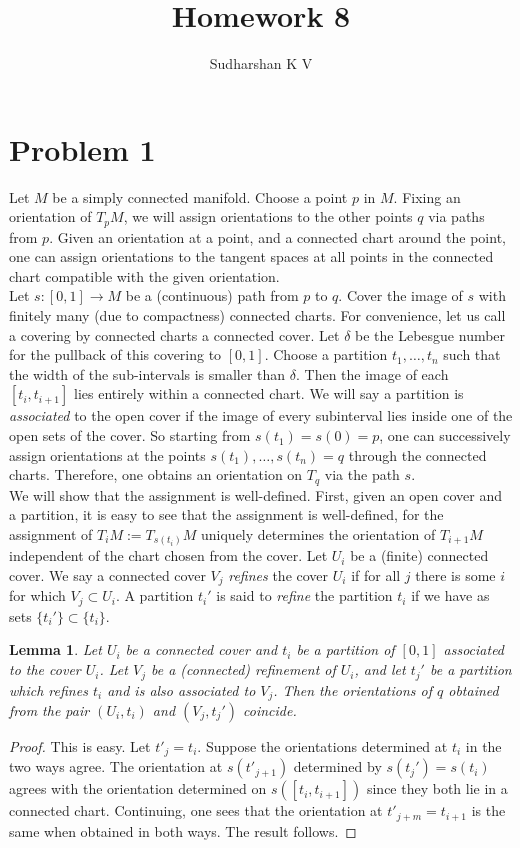 \documentclass{amsart}
\title{Homework 8}
\author{Sudharshan K V}
\numberwithin{equation}{section}
\theoremstyle{plain}
\newtheorem{lemma}[theorem]{Lemma}
\theoremstyle{definition}
\theoremstyle{remark}
\renewcommand{\_}[2]{\underbrace{#1}_{#2}}
\renewcommand{\^}[2]{\overbrace{#1}_{#2}}
\begin{document}
\maketitle

\section*{Problem 1}
Let $M$ be a simply connected manifold. Choose a point $p$ in $M$. Fixing an orientation of $T_pM$, we will assign orientations to the other points $q$ via paths from $p$. Given an orientation at a point, and a connected chart around the point, one can assign orientations to the tangent spaces at all points in the connected chart compatible with the given orientation. \\

Let $s:[0,1] \to M$ be a (continuous) path from $p$ to $q$. Cover the image of $s$ with finitely many (due to compactness) connected charts. For convenience, let us call a covering by connected charts a connected cover. Let $\delta$ be the Lebesgue number for the pullback of this covering to $[0,1]$. Choose a partition $t_1, \dots, t_n$ such that the width of the sub-intervals is smaller than $\delta$. Then the image of each $[t_i, t_{i+1}]$ lies entirely within a connected chart. We will say a partition is \emph{associated} to the open cover if the image of every subinterval lies inside one of the open sets of the cover. So starting from $s(t_1) = s(0) = p$, one can successively assign orientations at the points $s(t_1), \dots, s(t_n) = q$ through the connected charts. Therefore, one obtains an orientation on $T_q$ via the path $s$. \\

We will show that the assignment is well-defined. First, given an open cover and a partition, it is easy to see that the assignment is well-defined, for the assignment of $T_iM := T_{s(t_i)}M$ uniquely determines the orientation of $T_{i+1}M$ independent of the chart chosen from the cover. Let $U_i$ be a (finite) connected cover. We say a connected cover $V_j$ \emph{refines} the cover $U_i$ if for all $j$ there is some $i$ for which $V_j \subset U_i$. A partition $t_i'$ is said to \emph{refine} the partition $t_i$ if we have as sets $\{ t_i'\} \subset \{ t_i\}$. 
\setcounter{section}{1}
  \begin{lemma}
    Let $U_i$ be a connected cover and $t_i$ be a partition of $[0,1]$ associated to the cover $U_i$. Let $V_j$ be a (connected) refinement of $U_i$, and let $t_j'$ be a partition which refines $t_i$ and is also associated to $V_j$. Then the orientations of $q$ obtained from the pair $(U_i, t_i)$ and $(V_j, t_j')$ coincide.
  \end{lemma}
  \begin{proof}
    This is easy. Let $t'_j = t_i$. Suppose the orientations determined at $t_i$ in the two ways agree. The orientation at $s(t'_{j+1})$ determined by $s(t_j') = s(t_i)$ agrees with the orientation determined on $s([t_i,t_{i+1}])$ since they both lie in a connected chart. Continuing, one sees that the orientation at $t'_{j+m} = t_{i+1}$ is the same when obtained in both ways. The result follows.
  \end{proof}
\end{document}

